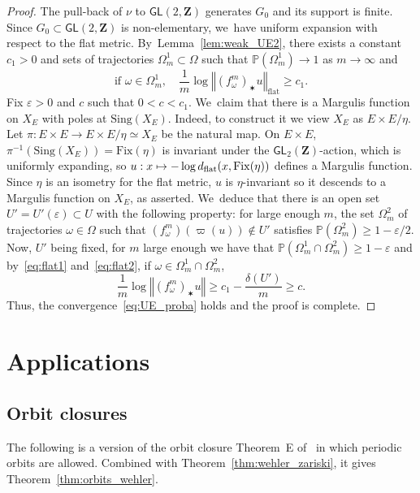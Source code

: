 \documentclass[11pt]{article}
\newcommand\mto{\mathchoice{\longmapsto}{\mapsto}{\mapsto}{\mapsto}}
\let\e\varepsilon
\newcommand{\norm}[1]{{\left\Vert#1\right\Vert}}
\newcommand{\unsur}[1]{\frac{1}{#1}}
\newcommand{\inv}{^{-1}}
\newcommand{\pp}{\mathbb{P}}\let\P\pp
\def\Z{\mathbf{Z}}
\newcommand{\Sing}{{\mathrm{Sing}}}
\newcommand\GL{{\mathsf{GL}}}
\theoremstyle{plain}
\theoremstyle{definition}
\numberwithin{equation}{section}
\begin{document}
\begin{proof}
The pull-back of
$\nu$ to $\GL(2, \Z)$ generates $G_0$ and its support is finite. Since $G_0\subset \GL(2, \Z)$ is non-elementary, we~have uniform expansion with respect to the flat metric. By~Lemma~\ref{lem:weak_UE2},
there exists a constant $c_1>0$ and sets of trajectories
$\Omega_m^1\subset \Omega$ such that $\pp(\Omega_m^1)\to 1$ as $m\to \infty$
and
\begin{equation}\label{eq:flat2}
\text{if }\omega\in \Omega_m^1, \quad
\unsur{m}\log \norm{(f_\omega^m)_\varstar u}_{\mathrm{flat}} \geq c_1 .
\end{equation}
Fix $\e>0$ and $c$ such that $0<c<c_1$. We~claim that there is a Margulis function on $X_E$ with poles at
$\Sing(X_E)$.
Indeed, to construct it we view $X_E$ as $E\times E/ \eta$. Let
$\pi:E\times E\to E\times E/\eta \simeq X_E$ be the natural map.
On
$E\times E$, $\pi\inv(\Sing (X_E)) =\mathrm{Fix}(\eta)$ is invariant under the $\GL_2(\Z)$-action, which
is uniformly expanding, so $ u :x\mto - \log d_{\mathrm{flat}}(x, \mathrm{Fix}(\eta))$ defines a
Margulis function. Since $\eta$ is an isometry for the flat metric, $u$ is
$\eta$-invariant so it descends to a Margulis function on $X_E$, as asserted. We~deduce that there is an open set $U' = U'(\e)\subset U$ with the following property:
for large enough $m$,
the set $\Omega_m^2$ of trajectories $\omega\in \Omega$ such that
$(f_\omega^m)(\varpi(u)) \notin U'$ satisfies $\pp(\Omega_m^2)\geq 1-\e/2$. Now,
$U'$ being fixed, for $m$ large enough we have that $\pp(\Omega_m^1\cap \Omega_m^2)\geq 1-\e$ and
by~\eqref{eq:flat1} and~\eqref{eq:flat2}, if $\omega \in \Omega_m^1\cap \Omega_m^2$,
\begin{equation*}
\unsur{m}\log \norm{(f_\omega^m)_\varstar u}\geq c_1 - \frac{\delta(U')}{m}\geq c.
\end{equation*}
Thus, the convergence~\eqref{eq:UE_proba} holds and the proof is complete.
\end{proof}

\section{Applications}\label{sec:applications}

\subsection{Orbit closures}
The following is a version of the orbit closure Theorem~E of~\cite{invariant} in which
periodic orbits are allowed.
Combined with Theorem~\ref{thm:wehler_zariski}, it gives
Theorem~\ref{thm:orbits_wehler}.
\end{document}
